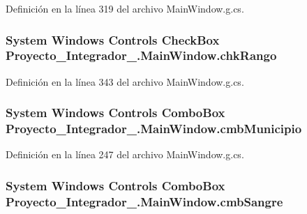 Definición en la línea 319 del archivo Main\-Window.\-g.\-cs.

\hypertarget{class_proyecto___integrador__3_1_1_main_window_a2ff6c258d8e7c249c15fbb0fc627f0d8}{
\subsubsection[{chk\-Rango}]{\setlength{\rightskip}{0pt plus 5cm}System Windows Controls Check\-Box Proyecto\-\_\-\-Integrador\-\_.\-Main\-Window.\-chk\-Rango\hspace{0.3cm}{\ttfamily [package]}}}\label{class_proyecto___integrador__3_1_1_main_window_a2ff6c258d8e7c249c15fbb0fc627f0d8}


Definición en la línea 343 del archivo Main\-Window.\-g.\-cs.

\hypertarget{class_proyecto___integrador__3_1_1_main_window_a6fad73b5f18398cb423384f61d36ff9a}{
\subsubsection[{cmb\-Municipio}]{\setlength{\rightskip}{0pt plus 5cm}System Windows Controls Combo\-Box Proyecto\-\_\-\-Integrador\-\_.\-Main\-Window.\-cmb\-Municipio\hspace{0.3cm}{\ttfamily [package]}}}\label{class_proyecto___integrador__3_1_1_main_window_a6fad73b5f18398cb423384f61d36ff9a}


Definición en la línea 247 del archivo Main\-Window.\-g.\-cs.

\hypertarget{class_proyecto___integrador__3_1_1_main_window_a78f29679759491825a6a30ad89e8a867}{
\subsubsection[{cmb\-Sangre}]{\setlength{\rightskip}{0pt plus 5cm}System Windows Controls Combo\-Box Proyecto\-\_\-\-Integrador\-\_.\-Main\-Window.\-cmb\-Sangre\hspace{0.3cm}{\ttfamily [package]}}}\label{class_proyecto___integrador__3_1_1_main_window_a78f29679759491825a6a30ad89e8a867}


